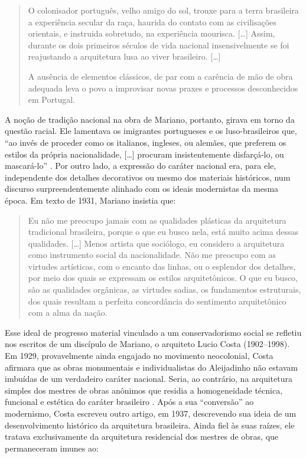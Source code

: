 \begin{quote}
O colonisador português, velho amigo do sol, trouxe para a terra
brasileira a experiência secular da raça, haurida do contato com as
civilisações orientais, e instruida sobretudo, na experiência mourisca.
{[}\ldots{]} Assim, durante os dois primeiros séculos de vida nacional
insensivelmente se foi reajustando a arquitetura lusa ao viver
brasileiro. {[}\ldots{]}

A ausência de elementos clássicos, de par com a carência de mão de obra
adequada leva o povo a improvisar novas praxes e processos desconhecidos
em Portugal. \autocite[p.~9--10]{mariannofilho:1943margem}
\end{quote}

A noção de tradição nacional na obra de Mariano, portanto, girava em
torno da questão racial. Ele lamentava os imigrantes portugueses e os
luso-brasileiros que, ``ao invés de proceder como os italianos,
ingleses, ou alemães, que preferem os estilos da própria nacionalidade,
{[}\ldots{]} procuram insistentemente disfarçá-lo, ou mascará-lo''
\autocite[p.~32]{mariannofilho:1943margem}. Por outro lado, a expressão
do caráter nacional era, para ele, independente dos detalhes decorativos
ou mesmo dos materiais históricos, num discurso surpreendentemente
alinhado com os ideais modernistas da mesma época. Em texto de 1931,
Mariano insistia que:

\begin{quote}
Eu não me preocupo jamais com as qualidades plásticas da arquitetura
tradicional brasileira, porque o que eu busco nela, está muito acima
dessas qualidades. {[}\ldots{]} Menos artista que sociólogo, eu
considero a arquitetura como instrumento social da nacionalidade. Não me
preocupo com as virtudes artísticas, com o encanto das linhas, ou o
esplendor dos detalhes, por meio dos quais se expressam os estilos
arquitetônicos. O que eu busco, são as qualidades orgânicas, as virtudes
sadias, os fundamentos estruturais, dos quais resultam a perfeita
concordância do sentimento arquitetônico com a alma da nação.
\autocite[p.~64]{mariannofilho:1943margem}
\end{quote}

Esse ideal de progresso material vinculado a um conservadorismo social
se refletiu nos escritos de um discípulo de Mariano, o arquiteto Lucio
Costa (1902--1998). Em 1929, provavelmente ainda engajado no movimento
neocolonial, Costa afirmara que as obras monumentais e individualistas
do Aleijadinho não estavam imbuídas de um verdadeiro caráter nacional.
Seria, ao contrário, na arquitetura simples dos mestres de obras
anônimos que residia a homogeneidade técnica, funcional e estética do
caráter brasileiro \autocite[p.~22]{puppi:1998historia}. Após a sua
``conversão'' ao modernismo, Costa escreveu outro artigo, em 1937,
descrevendo sua ideia de um desenvolvimento histórico da arquitetura
brasileira. Ainda fiel às suas raízes, ele tratava exclusivamente da
arquitetura residencial dos mestres de obras, que permaneceram imunes
ao:

